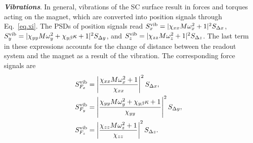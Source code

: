 \documentclass[twocolumn,superscriptaddress,floatfix,preprintnumbers,prl]{revtex4}
\begin{document}
\textbf{\textit{Vibrations}}.
In general, vibrations of the SC surface result in forces and torques acting on the magnet, which are converted into position signals through Eq.~\eqref{eq.xi}. The PSDs of position signals read 
$S_x^{\rm vib}=|\chi_{xx}M\omega_x^2+1|^2 S_{\Delta x}$,
$S_y^{\rm vib}=|\chi_{yy}M\omega_y^2+\chi_{y\beta}\kappa+1|^2 S_{\Delta y}$, and
$S_z^{\rm vib}=|\chi_{zz}M\omega_z^2+1|^2 S_{\Delta z}$. 
The last term in these expressions accounts for the change of distance between the readout system and the magnet as a result of the vibration. The corresponding force signals are
\begin{align}
S_{F_x}^{\rm vib}&=\left|\frac{\chi_{xx}M\omega_x^2+1}{\chi_{xx}}\right|^2 S_{\Delta x},\\
S_{F_y}^{\rm vib}&=\left|\frac{\chi_{yy}M\omega_y^2+\chi_{y\beta}\kappa+1}{\chi_{yy}}\right|^2 S_{\Delta y},\\
S_{F_z}^{\rm vib}&=\left|\frac{\chi_{zz}M\omega_z^2+1}{\chi_{zz}}\right|^2 S_{\Delta z}.
\end{align}

\vspace{2mm}
\end{document}
